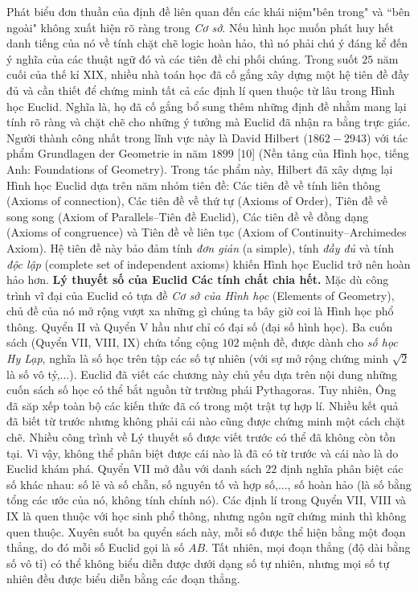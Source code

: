 \begin{multicols}{2}
	Phát biểu đơn thuần của định đề liên quan đến các khái niệm"bên trong" và ``bên ngoài" không xuất hiện rõ ràng trong \textit{Cơ sở}. Nếu hình học muốn phát huy hết danh tiếng của nó về tính chặt chẽ logic hoàn hảo, thì nó phải chú ý đáng kể đến ý nghĩa của các thuật ngữ đó và các tiên đề chi phối chúng. 
	\vskip 0.1cm
	Trong suốt $25$ năm cuối của thế kỉ XIX, nhiều nhà toán học đã cố gắng xây dựng một hệ tiên đề đầy đủ và cần thiết để chứng minh tất cả các định lí quen thuộc từ lâu trong Hình học Euclid. Nghĩa là, họ đã cố gắng bổ sung thêm những định đề nhằm mang lại tính rõ ràng và chặt chẽ cho những ý tưởng mà Euclid đã nhận ra bằng trực giác.  Người thành công nhất trong lĩnh vực này là David Hilbert ($1862-2943$) với tác phẩm Grundlagen der Geometrie in năm $1899$ [$10$] (Nền tảng của Hình học, tiếng Anh: Foundations of Geometry). Trong tác phẩm này, Hilbert đã xây dựng lại Hình học Euclid dựa trên năm nhóm tiên đề: Các tiên đề về tính liên thông (Axioms of connection), Các tiên đề về thứ tự (Axioms of Order), Tiên đề về song song (Axiom of Parallels--Tiên đề Euclid), Các tiên đề về đồng dạng (Axioms of congruence) và Tiên đề về liên tục (Axiom of Continuity--Archimedes Axiom).  Hệ tiên đề này bảo đảm tính \textit{đơn giản} (a simple), tính \textit{đầy đủ} và tính \textit{độc lập} (complete set of independent axioms) khiến Hình học Euclid trở nên hoàn hảo hơn.  
	\vskip 0.1cm
	\textbf{\color{lichsutoanhoc}Lý thuyết số của Euclid}
	\vskip 0.1cm
	\textbf{\color{lichsutoanhoc}Các tính chất chia hết.} Mặc dù công trình vĩ đại của Euclid có tựa đề \textit{Cơ sở của Hình học} (Elements of Geometry), chủ đề của nó mở rộng vượt xa những gì chúng ta bây giờ coi là Hình học phổ thông. Quyển II và Quyển V hầu như chỉ có đại số (đại số hình học). Ba cuốn sách (Quyển VII, VIII, IX) chứa tổng cộng $102$ mệnh đề, được dành cho \textit{số học Hy Lạp}, nghĩa là số học trên tập các số tự nhiên (với sự mở rộng chứng minh $\sqrt{2}$ là số vô tỷ,...). Euclid đã viết các chương này chủ yếu dựa trên nội dung những cuốn sách số học có thể bắt nguồn từ trường phái Pythagoras. Tuy nhiên, Ông đã săp xếp toàn bộ các kiến thức đã có trong một trật tự hợp lí. Nhiều kết quả đã biết từ trước nhưng không phải cái nào cũng được chứng minh một cách chặt chẽ. Nhiều công trình về Lý thuyết số được viết trước có thể đã không còn tồn tại. Vì vậy, không thể phân biệt được cái nào là đã có từ trước và cái nào là do Euclid khám phá. 
	\vskip 0.1cm
	Quyển VII mở đầu với danh sách $22$ định nghĩa phân biệt các số khác nhau: số lẻ và số chẵn, số nguyên tố và hợp số,..., số hoàn hảo (là số bằng tổng các ước của nó, không tính chính nó). Các định lí trong Quyển VII, VIII và IX là quen thuộc với học sinh phổ thông, nhưng ngôn ngữ chứng minh thì không quen thuộc. Xuyên suốt ba quyển sách này, mỗi số được thể hiện bằng một đoạn thẳng, do đó mỗi số Euclid gọi là số $AB$. Tất nhiên, mọi đoạn thẳng (độ dài bằng số vô tỉ) có thể không biểu diễn được dưới dạng số tự nhiên, nhưng mọi số tự nhiên đều được biểu diễn bằng các đoạn thẳng.

\end{multicols}

